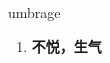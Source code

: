 
\begin{frame}
{\huge umbrage}
\begin{center}
\begin{enumerate}\Large
  \item \textbf{不悦，生气}
\end{enumerate}
\end{center}
\end{frame}
